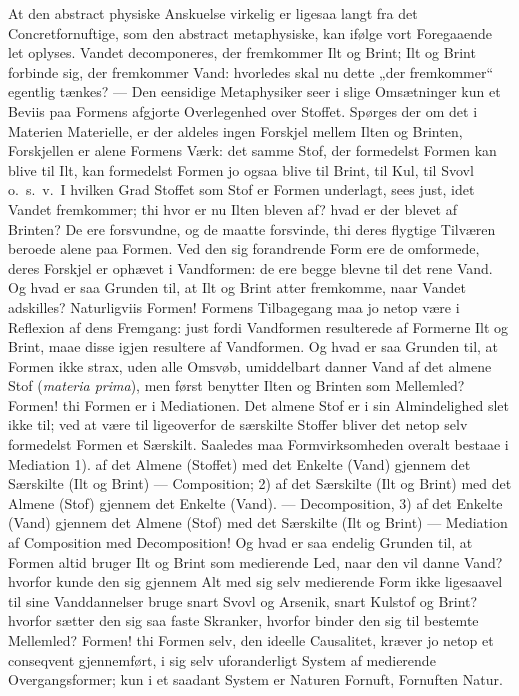 \documentclass[12pt,a4paper]{book}
\begin{document}
At den abstract physiske Anskuelse virkelig er ligesaa langt
fra det Concretfornuftige, som den abstract metaphysiske, kan
ifølge vort Foregaaende let oplyses. Vandet decomponeres,
der fremkommer Ilt og Brint; Ilt og Brint forbinde sig,
der fremkommer Vand: hvorledes skal nu dette „der
fremkommer“ egentlig tænkes? --- Den eensidige Metaphysiker seer
i slige Omsætninger kun et Beviis paa Formens afgjorte
Overlegenhed over Stoffet. Spørges der om det i Materien
Materielle, er der aldeles ingen Forskjel mellem Ilten og
Brinten, Forskjellen er alene Formens Værk: det samme
Stof, der formedelst Formen kan blive til Ilt, kan formedelst
Formen jo ogsaa blive til Brint, til Kul, til Svovl o.~s.~v.\
I hvilken Grad Stoffet som Stof er Formen underlagt,
sees just, idet Vandet fremkommer; thi hvor er nu Ilten
bleven af? hvad er der blevet af Brinten? De ere forsvundne,
og de maatte forsvinde, thi deres flygtige Tilværen beroede
alene paa Formen. Ved den sig forandrende Form ere de
omformede, deres Forskjel er ophævet i Vandformen: de ere
begge blevne til det rene Vand. Og hvad er saa Grunden
til, at Ilt og Brint atter fremkomme, naar Vandet
adskilles? Naturligviis Formen! Formens Tilbagegang maa
jo netop være i Reflexion af dens Fremgang: just fordi
Vandformen resulterede af Formerne Ilt og Brint, maae disse
igjen resultere af Vandformen. Og hvad er saa Grunden
til, at Formen ikke strax, uden alle Omsvøb, umiddelbart
danner Vand af det almene Stof (\textit{materia prima}), men
først benytter Ilten og Brinten som Mellemled? Formen!
thi Formen er i Mediationen. Det almene Stof er i sin
Almindelighed slet ikke til; ved at være til ligeoverfor de
særskilte Stoffer bliver det netop selv formedelst Formen et
Særskilt. Saaledes maa Formvirksomheden overalt bestaae
i Mediation 1). af det Almene (Stoffet) med det Enkelte
(Vand) gjennem det Særskilte (Ilt og Brint) --- Composition;
2) af det Særskilte (Ilt og Brint) med det Almene (Stof)
gjennem det Enkelte (Vand). --- Decomposition, 3) af det
Enkelte (Vand) gjennem det Almene (Stof) med det
Særskilte (Ilt og Brint) --- Mediation af Composition med
Decomposition! Og hvad er saa endelig Grunden til, at
Formen altid bruger Ilt og Brint som medierende Led,
naar den vil danne Vand? hvorfor kunde den sig gjennem
Alt med sig selv medierende Form ikke ligesaavel til sine
Vanddannelser bruge snart Svovl og Arsenik, snart Kulstof
og Brint? hvorfor sætter den sig saa faste Skranker, hvorfor
binder den sig til bestemte Mellemled? Formen! thi Formen
selv, den ideelle Causalitet, kræver jo netop et conseqvent
gjennemført, i sig selv uforanderligt System af medierende
Overgangsformer; kun i et saadant System er Naturen
Fornuft, Fornuften Natur.
\end{document}
